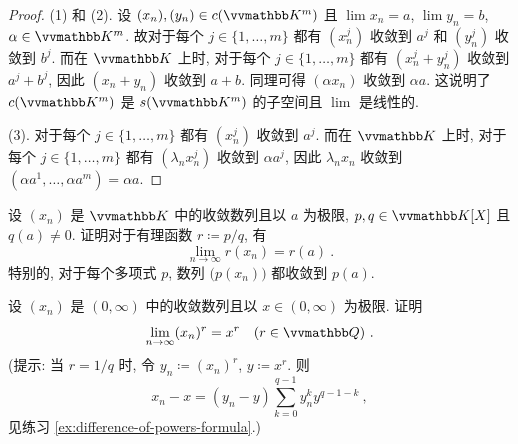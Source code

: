 \begin{proof}
    (1) 和 (2). 设 \((x_n), (y_n) \in c(\K^m)\) 且 \(\lim x_n = a\), \(\lim y_n = b\), \(\alpha \in \K^m\). 故对于每个 \(j \in \{1, \ldots, m\}\) 都有 \((x_n^j)\) 收敛到 \(a^j\) 和 \((y_n^j)\) 收敛到 \(b^j\). 而在 \(\K\) 上时, 对于每个 \(j \in \{1, \ldots, m\}\) 都有 \((x_n^j + y_n^j)\) 收敛到 \(a^j + b^j\), 因此 \((x_n + y_n)\) 收敛到 \(a + b\). 同理可得 \((\alpha x_n)\) 收敛到 \(\alpha a\). 这说明了 \(c(\K^m)\) 是 \(s(\K^m)\) 的子空间且 \(\lim\) 是线性的.

    (3). 对于每个 \(j \in \{1, \ldots, m\}\) 都有 \((x_n^j)\) 收敛到 \(a^j\). 而在 \(\K\) 上时, 对于每个 \(j \in \{1, \ldots, m\}\) 都有 \((\lambda_n x_n^j)\) 收敛到 \(\alpha a^j\), 因此 \(\lambda_n x_n\) 收敛到 \((\alpha a^1, \ldots, \alpha a^m) = \alpha a\).
\end{proof}

\begin{exercise}
    设 \((x_n)\) 是 \(\K\) 中的收敛数列且以 \(a\) 为极限, \(p, q \in \K[X]\) 且 \(q(a) \neq 0\). 证明对于有理函数 \(r \coloneqq p / q\), 有
    \[
        \lim_{n \to \infty} r(x_n) = r(a)\ .
    \]
    特别的, 对于每个多项式 \(p\), 数列 \(\bigl(p(x_n)\bigr)\) 都收敛到 \(p(a)\).
\end{exercise}

\begin{exercise}\label{ex:sequence-power-equal-limit-power}
    设 \((x_n)\) 是 \((0, \infty)\) 中的收敛数列且以 \(x \in (0, \infty)\) 为极限. 证明
    \[
        \lim_{n \to \infty} (x_n)^r = x^r\quad (r \in \Q)\ .
    \]
    (提示: 当 \(r = 1 / q\) 时, 令 \(y_n \coloneqq (x_n)^r\), \(y \coloneqq x^r\). 则
    \[
        x_n - x = (y_n - y) \sum_{k = 0}^{q - 1} y_n^k y^{q - 1 - k}\ ,
    \]
    见练习 \ref{ex:difference-of-powers-formula}.)
\end{exercise}


